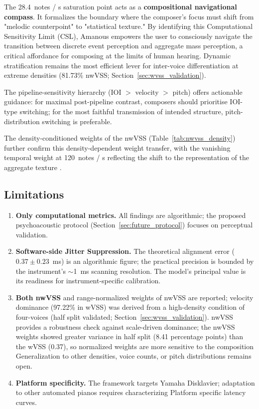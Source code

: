 \documentclass[a4paper]{article}
\theoremstyle{definition}
\theoremstyle{remark}
\begin{document}
The 28.4~notes / s saturation point acts as a \textbf{compositional navigational compass}. It formalizes the boundary where the composer's focus must shift from "melodic counterpoint" to "statistical texture." By identifying this Computational Sensitivity Limit (CSL), Amanous empowers the user to consciously navigate the transition between discrete event perception and aggregate mass perception, a critical affordance for composing at the limits of human hearing. Dynamic stratification remains the most efficient lever for inter-voice differentiation at extreme densities (81.73\% nwVSS; Section~\ref{sec:wvss_validation}).

The pipeline-sensitivity hierarchy (IOI $>$ velocity $>$ pitch) offers actionable guidance: for maximal post-pipeline contrast, composers should prioritise IOI-type switching; for the most faithful transmission of intended structure, pitch-distribution switching is preferable.

The density-conditioned weights of the nwVSS (Table~\ref{tab:nwvss_density}) further confirm this density-dependent weight transfer, with the vanishing temporal weight at 120~notes / s reflecting the shift to the representation of the aggregate texture \citep{roads2004microsound}.

\subsection{Limitations}

\begin{enumerate}
    \item \textbf{Only computational metrics.} All findings are algorithmic; the proposed psychoacoustic protocol (Section~\ref{sec:future_protocol}) focuses on perceptual validation.

    \item \textbf{Software-side Jitter Suppression.} The theoretical alignment error ($0.37 \pm 0.23$~ms) is an algorithmic figure; the practical precision is bounded by the instrument's ${\sim}$1~ms scanning resolution. The model's principal value is its readiness for instrument-specific calibration.

    \item \textbf{Both nwVSS} and range-normalized weights of nwVSS are reported; velocity dominance (97.22\% in wVSS) was derived from a high-density condition of four-voices (half split validated; Section~\ref{sec:wvss_validation}). nwVSS provides a robustness check against scale-driven dominance; the nwVSS weights showed greater variance in half split (8.41 percentage points) than the wVSS (0.37), so normalized weights are more sensitive to the composition Generalization to other densities, voice counts, or pitch distributions remains open.

    \item \textbf{Platform specificity.} The framework targets Yamaha Disklavier; adaptation to other automated pianos requires characterizing Platform specific latency curves.
\end{enumerate}
\end{document}
